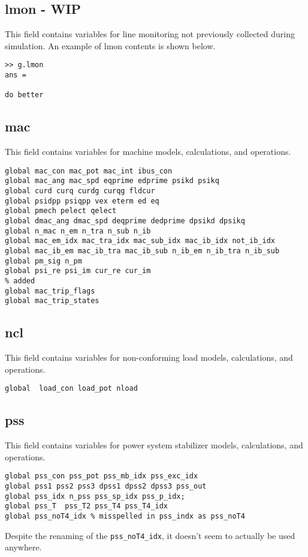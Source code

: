 \subsection{lmon - WIP}  
This field contains variables for line monitoring not previously collected during simulation.
An example of lmon contents is shown below.
\begin{verbatim}
>> g.lmon
ans = 

do better
\end{verbatim}

\subsection{mac}
This field contains variables for machine models, calculations, and operations.
\begin{verbatim}
global mac_con mac_pot mac_int ibus_con
global mac_ang mac_spd eqprime edprime psikd psikq
global curd curq curdg curqg fldcur
global psidpp psiqpp vex eterm ed eq
global pmech pelect qelect
global dmac_ang dmac_spd deqprime dedprime dpsikd dpsikq
global n_mac n_em n_tra n_sub n_ib
global mac_em_idx mac_tra_idx mac_sub_idx mac_ib_idx not_ib_idx
global mac_ib_em mac_ib_tra mac_ib_sub n_ib_em n_ib_tra n_ib_sub
global pm_sig n_pm 
global psi_re psi_im cur_re cur_im
% added
global mac_trip_flags
global mac_trip_states
\end{verbatim}

\subsection{ncl}
This field contains variables for non-conforming load models, calculations, and operations.
\begin{verbatim}
global  load_con load_pot nload
\end{verbatim}

\subsection{pss}
This field contains variables for power system stabilizer models, calculations, and operations.
\begin{verbatim}
global pss_con pss_pot pss_mb_idx pss_exc_idx
global pss1 pss2 pss3 dpss1 dpss2 dpss3 pss_out
global pss_idx n_pss pss_sp_idx pss_p_idx;
global pss_T  pss_T2 pss_T4 pss_T4_idx  
global pss_noT4_idx % misspelled in pss_indx as pss_noT4
\end{verbatim}
Despite the renaming of the \verb|pss_noT4_idx|, it doesn't seem to actually be used anywhere.



